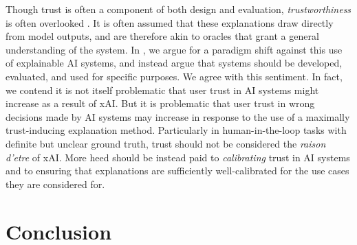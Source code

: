 Though trust is often a component of both design and evaluation, \emph{trustworthiness} is often overlooked \cite{jacovi_formalizing_2021,lundberg_unified_2017,ribeiro_why_2016,jacobs_how_2021}. It is often assumed that these explanations draw directly from model outputs, and are therefore akin to oracles that grant a general understanding of the system. In \textcite{natarajan_trust_2023}, we argue for a paradigm shift against this use of explainable AI systems, and instead argue that systems should be developed, evaluated, and used for specific purposes. We agree with this sentiment. In fact, we contend it is not itself problematic that user trust in AI systems might increase as a result of xAI. But it is problematic that user trust in wrong decisions made by AI systems may increase in response to the use of a maximally trust-inducing explanation method. Particularly in human-in-the-loop tasks with definite but unclear ground truth, trust should not be considered the \emph{raison d'etre} of xAI. More heed should be instead paid to \emph{calibrating} trust in AI systems and to ensuring that explanations are sufficiently well-calibrated for the use cases they are considered for.

\section{Conclusion}
